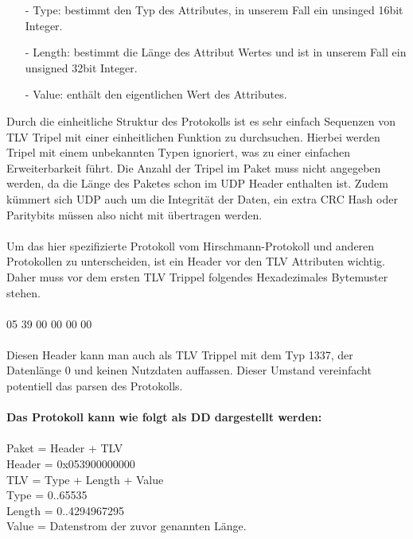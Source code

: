 \begin{itemize}
 \item[-] Type: bestimmt den Typ des Attributes, in unserem Fall ein unsinged 
                16bit Integer.
 \item[-] Length: bestimmt die Länge des Attribut Wertes und ist 
                  in unserem Fall ein unsigned 32bit Integer.
 \item[-] Value: enthält den eigentlichen Wert des Attributes.
\end{itemize}

Durch die einheitliche Struktur des Protokolls ist es sehr einfach Sequenzen von
TLV Tripel mit einer einheitlichen Funktion zu durchsuchen.
Hierbei werden Tripel mit einem unbekannten Typen ignoriert, was zu einer 
einfachen Erweiterbarkeit führt. Die Anzahl der Tripel im Paket muss nicht 
angegeben werden, da die Länge des Paketes schon im UDP Header enthalten ist.
Zudem kümmert sich UDP auch um die Integrität der Daten, ein extra CRC Hash oder
Paritybits müssen also nicht mit übertragen werden.
\\ \\
Um das hier spezifizierte Protokoll vom Hirschmann-Protokoll und anderen
Protokollen zu unterscheiden, ist ein Header vor den TLV Attributen wichtig. Daher muss vor dem ersten TLV Trippel 
folgendes Hexadezimales Bytemuster stehen.
\\ \\
05 39 00 00 00 00
\\ \\
Diesen Header kann man auch als TLV Trippel mit dem Typ 1337, der Datenlänge
0 und keinen Nutzdaten auffassen. Dieser Umstand vereinfacht potentiell das parsen des Protokolls.
\\ \\
\textbf{Das Protokoll kann wie folgt als DD dargestellt werden:} \\ \\
Paket = Header + {TLV} \\
Header = 0x053900000000 \\
TLV = Type + Length + Value  \\
Type = 0..65535  \\
Length = 0..4294967295 \\
Value = Datenstrom der zuvor genannten Länge. \\
\\ 
